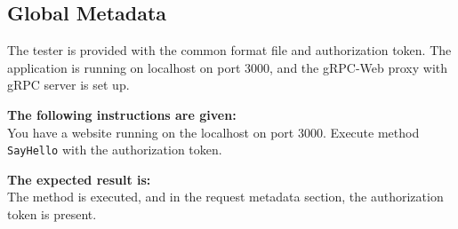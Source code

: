 \subsection{Global Metadata}
The tester is provided with the common format file and authorization token.
The application is running on localhost on port 3000, and the gRPC-Web proxy with gRPC server is set up.

\textbf{The following instructions are given:}\\
You have a website running on the localhost on port 3000.
Execute method \texttt{SayHello} with the authorization token.

\textbf{The expected result is:}\\
The method is executed, and in the request metadata section, the authorization token is present.


